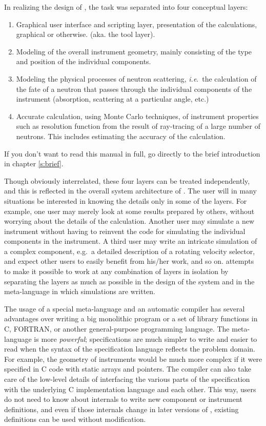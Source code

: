 In realizing the design of \MCS, the task was
separated into four conceptual layers:
\begin{enumerate}
\item Graphical user interface and scripting layer, presentation of
  the calculations, graphical or otherwise. (aka. the tool layer).
\item Modeling of the overall instrument geometry, mainly consisting
  of the type and position of the individual components.
\item Modeling the physical processes of neutron scattering, \textit{i.e}.\
  the calculation of the fate of a neutron that passes through the
  individual components of the instrument (absorption, scattering at a
  particular angle, etc.)
\item Accurate calculation, using Monte Carlo techniques, of
  instrument properties such as resolution function from the result of
  ray-tracing of a large number of neutrons. This includes estimating
  the accuracy of the calculation.
\end{enumerate}

If you don't want to read this manual in full, go directly to the brief introduction in chapter \ref{s:brief}.

Though obviously interrelated, these four layers can be
treated independently, and this is reflected in the overall system
architecture of \MCS. The user will in many situations be
interested in knowing the details only in some of the layers. For
example, one user may merely look at some results prepared by others,
without worrying about the details of the calculation. Another user
may simulate a new instrument without having to reinvent the
code for simulating the individual components in the instrument. A third
user may write an intricate simulation of a complex component,
e.g.\ a detailed description of a rotating velocity selector,
and expect other users to easily
benefit from his/her work, and so on. \MCS attempts to make it
possible to work at any combination of layers in isolation by separating
the layers as much as possible in the design of the system and in
the meta-language in which simulations are written.

The usage of a special meta-language and an automatic compiler has
several advantages over writing a big monolithic program or a set of
library functions in C, FORTRAN, or another general-purpose programming
language.  The meta-language is more \textit{powerful}; specifications
are much simpler to write and easier to read when the syntax of the
specification language reflects the problem domain. For example, the
geometry of instruments would be much more complex if it were specified
in C code with static arrays and pointers. The compiler can also take
care of the low-level details of interfacing the various parts of the
specification with the underlying C implementation language and each
other. This way, users do not need to know about \MCS internals to
write new component or instrument definitions, and even if those
internals change in later versions of \MCS, existing definitions can be
used without modification.

